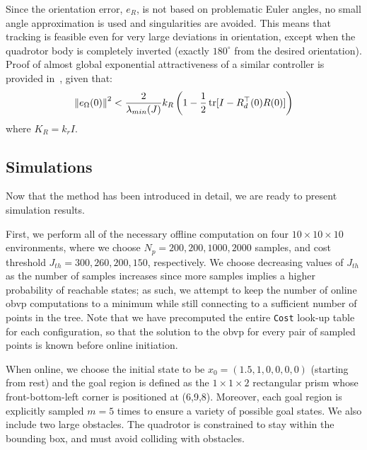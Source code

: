 Since the orientation error, $e_R$, is not based on problematic Euler angles, no small angle approximation is used and singularities are avoided. This means that tracking is feasible even for very large deviations in orientation, except when the quadrotor body is completely inverted (exactly $180^\circ$ from the desired orientation). Proof of almost global exponential attractiveness of a similar controller is provided in~\cite{Lee2010}, given that:
\begin{equation}
    \left\lVert e_\Omega (0)\right\rVert^2 < \frac{2}{\lambda_{min}(J)}k_R \left( 1 - \frac{1}{2}\operatorname{tr}[I - R_d^\top(0)R(0)] \right)
\end{equation}
where $K_R = k_r I$.





\subsection{Simulations}


Now that the method has been introduced in detail, we are ready to present simulation results.

First, we perform all of the necessary offline computation on four $10 \times 10 \times 10$ environments, where we choose $N_p = 200, 200, 1000, 2000$ samples, and cost threshold $J_{th} = 300, 260, 200, 150$, respectively. We choose decreasing values of $J_{th}$ as the number of samples increases since more samples implies a higher probability of reachable states; as such, we attempt to keep the number of online \gls{obvp} computations to a minimum while still connecting to a sufficient number of points in the tree. Note that we have precomputed the entire \texttt{Cost} look-up table for each configuration, so that the solution to the \gls{obvp} for every pair of sampled points is known before online initiation.

When online, we choose the initial state to be $x_0 = (1.5, 1, 0, 0, 0, 0)$ (starting from rest) and the goal region is defined as the $1 \times 1 \times 2$ rectangular prism whose front-bottom-left corner is positioned at (6,9,8). Moreover, each goal region is explicitly sampled $m = 5$ times to ensure a variety of possible goal states. We also include two large obstacles. The quadrotor is constrained to stay within the bounding box, and must avoid colliding with obstacles.

